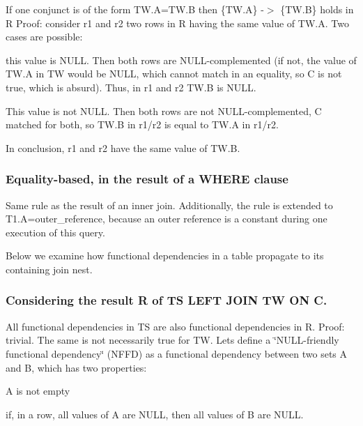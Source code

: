 If one conjunct is of the form T\+W.\+A=T\+W.\+B then \{T\+W.\+A\} -\/$>$ \{T\+W.\+B\} holds in R Proof\+: consider r1 and r2 two rows in R having the same value of T\+W.\+A. Two cases are possible\+:
\begin{DoxyItemize}
\item this value is N\+U\+LL. Then both rows are N\+U\+LL-\/complemented (if not, the value of T\+W.\+A in TW would be N\+U\+LL, which cannot match in an equality, so C is not true, which is absurd). Thus, in r1 and r2 T\+W.\+B is N\+U\+LL.
\item This value is not N\+U\+LL. Then both rows are not N\+U\+LL-\/complemented, C matched for both, so T\+W.\+B in r1/r2 is equal to T\+W.\+A in r1/r2.
\item In conclusion, r1 and r2 have the same value of T\+W.\+B.
\end{DoxyItemize}\hypertarget{group__AGGREGATE__CHECKS_WHEREEQ}{}\subsubsection{Equality-\/based, in the result of a W\+H\+E\+R\+E clause}\label{group__AGGREGATE__CHECKS_WHEREEQ}
Same rule as the result of an inner join. Additionally, the rule is extended to T1.\+A=outer\+\_\+reference, because an outer reference is a constant during one execution of this query.

Below we examine how functional dependencies in a table propagate to its containing join nest.\hypertarget{group__AGGREGATE__CHECKS_PROPAGOUTER}{}\subsubsection{Considering the result R of T\+S L\+E\+F\+T J\+O\+I\+N T\+W O\+N C.}\label{group__AGGREGATE__CHECKS_PROPAGOUTER}
All functional dependencies in TS are also functional dependencies in R. Proof\+: trivial. The same is not necessarily true for TW. Let\textquotesingle{}s define a \char`\"{}\+N\+U\+L\+L-\/friendly functional dependency\char`\"{} (N\+F\+FD) as a functional dependency between two sets A and B, which has two properties\+:
\begin{DoxyItemize}
\item A is not empty
\item if, in a row, all values of A are N\+U\+LL, then all values of B are N\+U\+LL.
\end{DoxyItemize}

